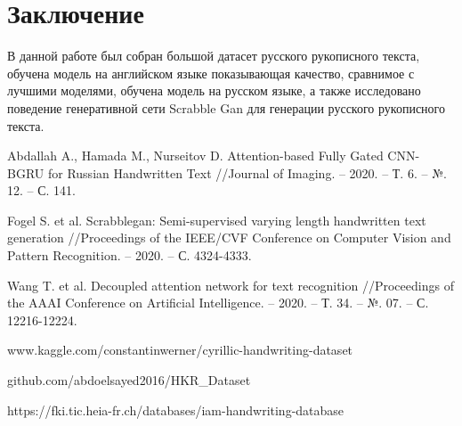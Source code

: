 \documentclass[12pt]{article}
\begin{document}
\section{Заключение}
В данной работе был собран большой датасет русского рукописного текста, обучена модель на английском языке показывающая качество,
сравнимое с лучшими моделями, обучена модель на русском языке, а также исследовано поведение генеративной сети Scrabble Gan для 
генерации русского рукописного текста.

\newpage
\begin{thebibliography}{9}
    Abdallah A., Hamada M., Nurseitov D.
    Attention-based Fully Gated CNN-BGRU for Russian Handwritten Text //Journal of Imaging. – 2020. – Т. 6. – №. 12. – С. 141.

    Fogel S. et al. Scrabblegan: Semi-supervised varying length handwritten
    text generation //Proceedings of the IEEE/CVF Conference on 
    Computer Vision and Pattern Recognition. – 2020. – С. 4324-4333.

    Wang T. et al. Decoupled attention network for text recognition 
    //Proceedings of the AAAI Conference on Artificial Intelligence. – 2020. – Т. 34. – №. 07. – С. 12216-12224.

    www.kaggle.com/constantinwerner/cyrillic-handwriting-dataset

    github.com/abdoelsayed2016/HKR\_Dataset

    https://fki.tic.heia-fr.ch/databases/iam-handwriting-database

\end{thebibliography}
\end{document}
